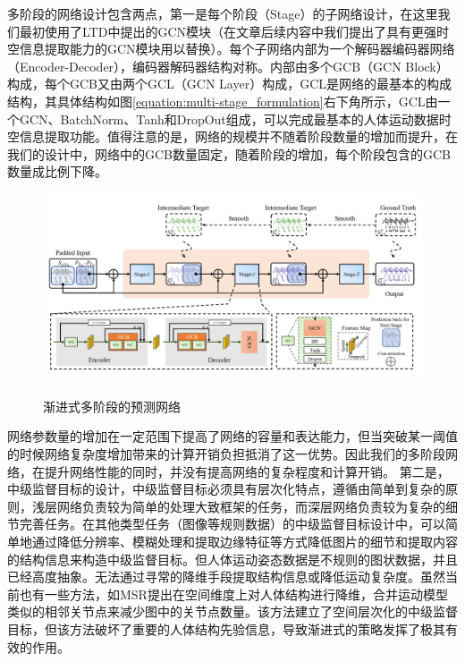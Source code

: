 多阶段的网络设计包含两点，第一是每个阶段（Stage）的子网络设计，在这里我们最初使用了LTD中提出的GCN模块（在文章后续内容中我们提出了具有更强时空信息提取能力的GCN模块用以替换）。每个子网络内部为一个解码器编码器网络（Encoder-Decoder），编码器解码器结构对称。内部由多个GCB（GCN Block）构成，每个GCB又由两个GCL（GCN Layer）构成，GCL是网络的最基本的构成结构，其具体结构如图\ref{equation:multi-stage_formulation}右下角所示，GCL由一个GCN、BatchNorm、Tanh和DropOut组成，可以完成最基本的人体运动数据时空信息提取功能。值得注意的是，网络的规模并不随着阶段数量的增加而提升，在我们的设计中，网络中的GCB数量固定，随着阶段的增加，每个阶段包含的GCB数量成比例下降。
\begin{figure}[ht]
    \centering
    \includegraphics[width=1\textwidth]{FigMa/multi-stage_network.png}\\
    \vspace{-0.3cm}
    \caption{渐进式多阶段的预测网络}
    \label{fig:multi_stage}
\end{figure}
网络参数量的增加在一定范围下提高了网络的容量和表达能力，但当突破某一阈值的时候网络复杂度增加带来的计算开销负担抵消了这一优势。因此我们的多阶段网络，在提升网络性能的同时，并没有提高网络的复杂程度和计算开销。
第二是，中级监督目标的设计，中级监督目标必须具有层次化特点，遵循由简单到复杂的原则，浅层网络负责较为简单的处理大致框架的任务，而深层网络负责较为复杂的细节完善任务。在其他类型任务（图像等规则数据）的中级监督目标设计中，可以简单地通过降低分辨率、模糊处理和提取边缘特征等方式降低图片的细节和提取内容的结构信息来构造中级监督目标。但人体运动姿态数据是不规则的图状数据，并且已经高度抽象。无法通过寻常的降维手段提取结构信息或降低运动复杂度。虽然当前也有一些方法，如MSR\parencite{dang2021msr}提出在空间维度上对人体结构进行降维，合并运动模型类似的相邻关节点来减少图中的关节点数量。该方法建立了空间层次化的中级监督目标，但该方法破坏了重要的人体结构先验信息，导致渐进式的策略发挥了极其有效的作用。

